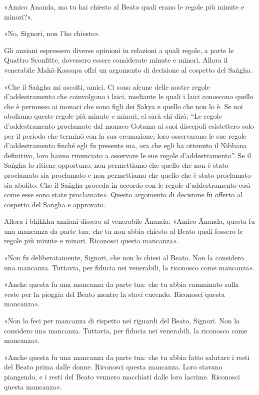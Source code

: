 «Amico Ānanda, ma tu hai chiesto al Beato quali erano le regole più minute e
minori?».

«No, Signori, non l’ho chiesto».

 Gli anziani espressero diverse opinioni in
relazioni a quali regole, a parte le Quattro Sconfitte, dovessero essere
considerate minute e minori. Allora il venerabile Mahā-Kassapa offrì un
argomento di decisione al cospetto del Saṅgha.

 «Che il Saṅgha mi ascolti, amici. Ci sono alcune delle
nostre regole d’addestramento che coinvolgono i laici, mediante le quali i laici
conoscono quello che è permesso ai monaci che sono figli dei Sakya e quello che
non lo è. Se noi aboliamo queste regole più minute e minori, ci sarà chi dirà:
“Le regole d’addestramento proclamate dal monaco Gotama ai suoi discepoli
esistettero solo per il periodo che terminò con la sua cremazione; loro
osservarono le sue regole d’addestramento finché egli fu presente ma, ora che
egli ha ottenuto il Nibbāna definitivo, loro hanno rinunciato a osservare le sue
regole d’addestramento”. Se il Saṅgha lo ritiene opportuno, non permettiamo che
quello che non è stato proclamato sia proclamato e non permettiamo che quello
che è stato proclamato sia abolito. Che il Saṅgha proceda in accordo con le
regole d’addestramento così come esse sono state proclamate». Questo argomento
di decisione fu offerto al cospetto del Saṅgha e approvato.

Allora i bhikkhu anziani dissero al venerabile Ānanda: «Amico Ānanda, questa fu
una mancanza da parte tua: che tu non abbia chiesto al Beato quali fossero le
regole più minute e minori. Riconosci questa mancanza».

«Non fu deliberatamente, Signori, che non lo chiesi al Beato. Non la considero
una mancanza. Tuttavia, per fiducia nei venerabili, la riconosco come mancanza».

«Anche questa fu una mancanza da parte tua: che tu abbia camminato sulla veste
per la pioggia del Beato mentre la stavi cucendo. Riconosci questa mancanza».

«Non lo feci per mancanza di rispetto nei riguardi del Beato, Signori. Non la
considero una mancanza. Tuttavia, per fiducia nei venerabili, la riconosco come
mancanza».

«Anche questa fu una mancanza da parte tua: che tu abbia fatto salutare i resti
del Beato prima dalle donne. Riconosci questa mancanza. Loro stavano piangendo,
e i resti del Beato vennero macchiati dalle loro lacrime. Riconosci questa
mancanza».

